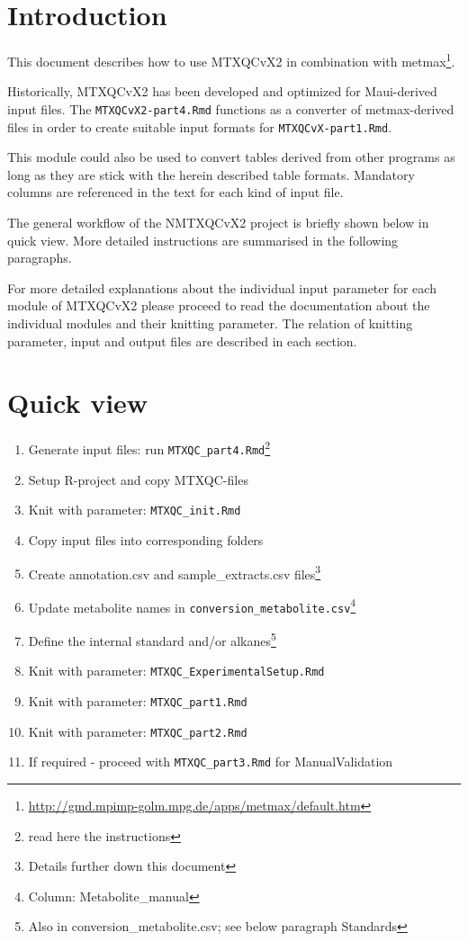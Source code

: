 \documentclass[]{book}
\providecommand{\tightlist}{%
  \setlength{\itemsep}{0pt}\setlength{\parskip}{0pt}}
\let\rmarkdownfootnote\footnote%
\def\footnote{\protect\rmarkdownfootnote}
\theoremstyle{definition}
\theoremstyle{definition}
\theoremstyle{definition}
\theoremstyle{remark}
\begin{document}
\section{Introduction}\label{introduction}

This document describes how to use MTXQCvX2 in combination with
metmax\footnote{\url{http://gmd.mpimp-golm.mpg.de/apps/metmax/default.htm}}.

Historically, MTXQCvX2 has been developed and optimized for Maui-derived
input files. The \texttt{MTXQCvX2-part4.Rmd} functions as a converter of
metmax-derived files in order to create suitable input formats for
\texttt{MTXQCvX-part1.Rmd}.

This module could also be used to convert tables derived from other
programs as long as they are stick with the herein described table
formats. Mandatory columns are referenced in the text for each kind of
input file.

The general workflow of the NMTXQCvX2 project is briefly shown below in
quick view. More detailed instructions are summarised in the following
paragraphs.

For more detailed explanations about the individual input parameter for
each module of MTXQCvX2 please proceed to read the documentation about
the individual modules and their knitting parameter. The relation of
knitting parameter, input and output files are described in each
section.

\section{Quick view}\label{quick-view}

\begin{enumerate}
\def\labelenumi{\arabic{enumi}.}
\tightlist
\item
  Generate input files: run \texttt{MTXQC\_part4.Rmd}\footnote{read here
    the instructions}
\item
  Setup R-project and copy MTXQC-files
\item
  Knit with parameter: \texttt{MTXQC\_init.Rmd}
\item
  Copy input files into corresponding folders
\item
  Create annotation.csv and sample\_extracts.csv files\footnote{Details
    further down this document}
\item
  Update metabolite names in
  \texttt{conversion\_metabolite.csv}\footnote{Column:
    Metabolite\_manual}
\item
  Define the internal standard and/or alkanes\footnote{Also in
    conversion\_metabolite.csv; see below paragraph Standards}
\item
  Knit with parameter: \texttt{MTXQC\_ExperimentalSetup.Rmd}
\item
  Knit with parameter: \texttt{MTXQC\_part1.Rmd}
\item
  Knit with parameter: \texttt{MTXQC\_part2.Rmd}
\item
  If required - proceed with \texttt{MTXQC\_part3.Rmd} for
  ManualValidation
\end{enumerate}
\end{document}
